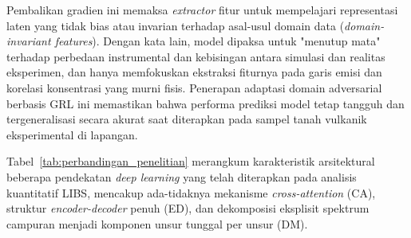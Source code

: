 Pembalikan gradien ini memaksa \textit{extractor} fitur untuk mempelajari representasi laten yang tidak bias atau invarian terhadap asal-usul domain data (\textit{domain-invariant features}). Dengan kata lain, model dipaksa untuk "menutup mata" terhadap perbedaan instrumental dan kebisingan antara simulasi dan realitas eksperimen, dan hanya memfokuskan ekstraksi fiturnya pada garis emisi dan korelasi konsentrasi yang murni fisis. Penerapan adaptasi domain adversarial berbasis GRL ini memastikan bahwa performa prediksi model tetap tangguh dan tergeneralisasi secara akurat saat diterapkan pada sampel tanah vulkanik eksperimental di lapangan.

Tabel~\ref{tab:perbandingan_penelitian} merangkum karakteristik arsitektural beberapa pendekatan \textit{deep learning} yang telah diterapkan pada analisis kuantitatif LIBS, mencakup ada-tidaknya mekanisme \textit{cross-attention} (CA), struktur \textit{encoder-decoder} penuh (ED), dan dekomposisi eksplisit spektrum campuran menjadi komponen unsur tunggal per unsur (DM).

